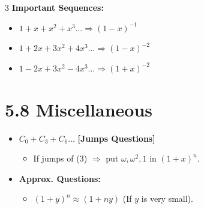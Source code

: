 \documentclass[11pt,a4paper,landscape]{article}
\begin{document}
\begin{multicols*}{3}
\textbf{Important Sequences:}
\begin{itemize}
\item $1 + x + x^2 + x^3 \dots \Rightarrow (1-x)^{-1}$
\item $1 + 2x + 3x^2 + 4x^3 \dots \Rightarrow (1-x)^{-2}$
\item $1 - 2x + 3x^2 - 4x^3 \dots \Rightarrow (1+x)^{-2}$
\end{itemize}

\section*{5.8 Miscellaneous}
\begin{itemize}
\item $C_0 + C_3 + C_6 \dots$ \textbf{[Jumps Questions]}
  \begin{itemize}
  \item If jumps of (3) $\Rightarrow$ put $\omega, \omega^2, 1$ in $(1+x)^n$.
  \end{itemize}
\item \textbf{Approx. Questions:}
  \begin{itemize}
  \item $(1+y)^n \approx (1+ny)$ \quad (If $y$ is very small).
  \end{itemize}
\end{itemize}

\end{multicols*}
\end{document}
